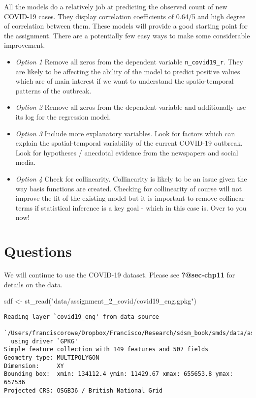 \documentclass[
  letterpaper,
  krantz2]{style/krantz}
\newenvironment{Shaded}{\begin{snugshade}}{\end{snugshade}}
\newcommand{\FunctionTok}[1]{\textcolor[rgb]{0.28,0.35,0.67}{#1}}
\newcommand{\NormalTok}[1]{\textcolor[rgb]{0.00,0.23,0.31}{#1}}
\newcommand{\OtherTok}[1]{\textcolor[rgb]{0.00,0.23,0.31}{#1}}
\newcommand{\StringTok}[1]{\textcolor[rgb]{0.13,0.47,0.30}{#1}}
\providecommand{\tightlist}{%
  \setlength{\itemsep}{0pt}\setlength{\parskip}{0pt}}\usepackage{longtable,booktabs,array}
\begin{document}
All the models do a relatively job at predicting the observed count of
new COVID-19 cases. They display correlation coefficients of 0.64/5 and
high degree of correlation between them. These models will provide a
good starting point for the assignment. There are a potentially few easy
ways to make some considerable improvement.

\begin{itemize}
\tightlist
\item
  \emph{Option 1} Remove all zeros from the dependent variable
  \texttt{n\_covid19\_r}. They are likely to be affecting the ability of
  the model to predict positive values which are of main interest if we
  want to understand the spatio-temporal patterns of the outbreak.
\item
  \emph{Option 2} Remove all zeros from the dependent variable and
  additionally use its log for the regression model.
\item
  \emph{Option 3} Include more explanatory variables. Look for factors
  which can explain the spatial-temporal variability of the current
  COVID-19 outbreak. Look for hypotheses / anecdotal evidence from the
  newspapers and social media.
\item
  \emph{Option 4} Check for collinearity. Collinearity is likely to be
  an issue given the way basis functions are created. Checking for
  collinearity of course will not improve the fit of the existing model
  but it is important to remove collinear terms if statistical inference
  is a key goal - which in this case is. Over to you now!
\end{itemize}

\hypertarget{questions-6}{%
\section{Questions}\label{questions-6}}

We will continue to use the COVID-19 dataset. Please see
\textbf{?@sec-chp11} for details on the data.

\begin{Shaded}
\begin{Highlighting}[]
\NormalTok{sdf }\OtherTok{\textless{}{-}} \FunctionTok{st\_read}\NormalTok{(}\StringTok{"data/assignment\_2\_covid/covid19\_eng.gpkg"}\NormalTok{)}
\end{Highlighting}
\end{Shaded}

\begin{verbatim}
Reading layer `covid19_eng' from data source 
  `/Users/franciscorowe/Dropbox/Francisco/Research/sdsm_book/smds/data/assignment_2_covid/covid19_eng.gpkg' 
  using driver `GPKG'
Simple feature collection with 149 features and 507 fields
Geometry type: MULTIPOLYGON
Dimension:     XY
Bounding box:  xmin: 134112.4 ymin: 11429.67 xmax: 655653.8 ymax: 657536
Projected CRS: OSGB36 / British National Grid
\end{verbatim}
\end{document}
